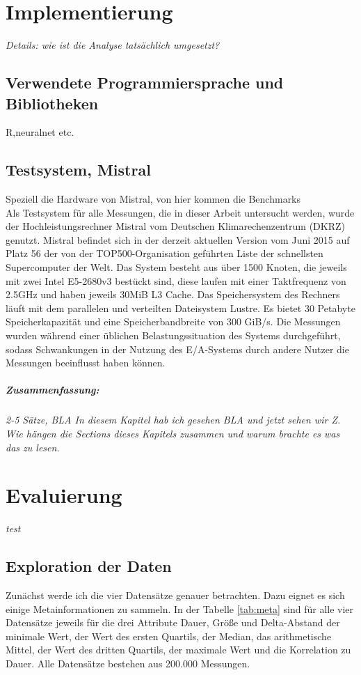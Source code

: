 \documentclass[
	12pt,
	a4paper,
	BCOR10mm,
	DIV14,
	listof=totoc,
	bibliography=totoc,
	headsepline
]{scrreprt}
\begin{document}
\chapter{Implementierung}
\textit{%
	Details: wie ist die Analyse tatsächlich umgesetzt?
}
\bigskip

\section{Verwendete Programmiersprache und Bibliotheken}
R,neuralnet etc.

\section{Testsystem, Mistral}
\label{impl:testsystem}
Speziell die Hardware von Mistral, von hier kommen die Benchmarks\\

Als Testsystem für alle Messungen, die in dieser Arbeit untersucht werden, wurde der Hochleistungsrechner Mistral vom Deutschen Klimarechenzentrum (DKRZ) genutzt. Mistral befindet sich in der derzeit aktuellen Version vom Juni 2015 auf Platz 56 der von der TOP500-Organisation geführten Liste der schnellsten Supercomputer der Welt. Das System besteht aus über 1500 Knoten, die jeweils mit zwei Intel E5-2680v3 bestückt sind, diese laufen mit einer Taktfrequenz von 2.5GHz und haben jeweils 30MiB L3 Cache. Das Speichersystem des Rechners läuft mit dem parallelen und verteilten Dateisystem Lustre. Es bietet 30 Petabyte Speicherkapazität und eine Speicherbandbreite von 300 GiB/s. Die Messungen wurden während einer üblichen Belastungssituation des Systems durchgeführt, sodass Schwankungen in der Nutzung des E/A-Systems durch andere Nutzer die Messungen beeinflusst haben können.


\paragraph{Zusammenfassung:}
\textit{2-5 Sätze, BLA In diesem Kapitel hab ich gesehen BLA und jetzt sehen wir Z. Wie hängen die Sections dieses Kapitels zusammen und warum brachte es was das zu lesen.}

\chapter{Evaluierung}
\textit{%
	test
}
\bigskip

\section{Exploration der Daten}
Zunächst werde ich die vier Datensätze genauer betrachten. Dazu eignet es sich einige Metainformationen zu sammeln. In der Tabelle \ref{tab:meta} sind für alle vier Datensätze jeweils für die drei Attribute Dauer, Größe und Delta-Abstand der minimale Wert, der Wert des ersten Quartils, der Median, das arithmetische Mittel, der Wert des dritten Quartils, der maximale Wert und die Korrelation zu Dauer. Alle Datensätze bestehen aus 200.000 Messungen.\\
\end{document}
